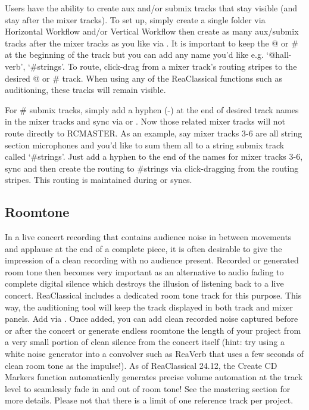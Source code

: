 \documentclass[10pt,american]{article}
\begin{document}
Users have the ability to create aux and/or submix tracks that stay visible (and
stay after the mixer tracks). To set up, simply create a single folder via
Horizontal Workflow  and/or Vertical Workflow  then create as
many aux/submix tracks after the mixer tracks as you like via \keys{\#}. It is
important to keep the @ or \# at the beginning of the track but you can add any
name you'd like e.g. `@hall-verb', `\#strings'. To route, click-drag from a
mixer track's routing stripes to the desired @ or \# track. When using any of
the ReaClassical functions such as auditioning, these tracks will remain
visible.

For \# submix tracks, simply add a hyphen (-) at the end of desired track names
in the mixer tracks and sync via  or . Now those related mixer
tracks will not route directly to RCMASTER. As an example, say mixer tracks 3-6
are all string section microphones and you'd like to sum them all to a string
submix track called `\#strings'. Just add a hyphen to the end of the names for
mixer tracks 3-6, sync and then create the routing to \#strings via
click-dragging from the routing stripes. This routing is maintained during
 or  syncs.

\subsection{Roomtone}

In a live concert recording that contains audience noise in between movements
and applause at the end of a complete piece, it is often desirable to give the
impression of a clean recording with no audience present. Recorded or generated
room tone then becomes very important as an alternative to audio fading to
complete digital silence which destroys the illusion of listening back to a live
concert. ReaClassical includes a dedicated room tone track for this purpose.
This way, the auditioning tool will keep the track displayed in both track and
mixer panels. Add via \keys{\#}. Once added, you can add clean recorded noise
captured before or after the concert or generate endless roomtone the length of
your project from a very small portion of clean silence from the concert itself
(hint: try using a white noise generator into a convolver such as ReaVerb that
uses a few seconds of clean room tone as the impulse!). As of ReaClassical
24.12, the Create CD Markers function automatically generates precise volume
automation at the track level to seamlessly fade in and out of room tone! See
the mastering section for more details. Please not that there is a limit of one
reference track per project.
\end{document}
